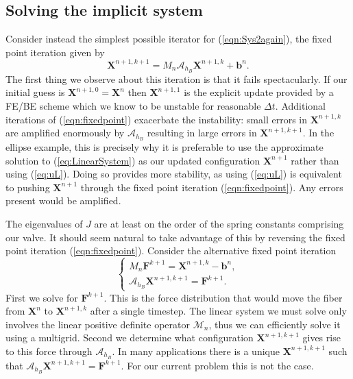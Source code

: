 \documentclass[preprint,12pt]{elsarticle}
\begin{document}
\subsection{Solving the implicit system}
Consider instead the simplest possible iterator for (\ref{eqn:Sys2again}), the fixed point iteration given by
\begin{equation}
\mathbf{X}^{n+1,k+1} = \mathit{M}_n\mathcal{A}_{h_B} \mathbf{X}^{n+1,k} + \mathbf{b}^n.
\label{eqn:fixedpoint}
\end{equation}
The first thing we observe about this iteration is that it fails spectacularly. If our initial guess is $\mathbf{X}^{n+1,0}=\mathbf{X}^n$ then $\mathbf{X}^{n+1,1}$ is the explicit update provided by a FE/BE scheme which we know to be unstable for reasonable $\Delta t$. Additional iterations of (\ref{eqn:fixedpoint}) exacerbate the instability: small errors in $\mathbf{X}^{n+1,k}$ are amplified enormously by $\mathcal{A}_{h_B}$ resulting in large errors in $\mathbf{X}^{n+1,k+1}$. In the ellipse example, this is precisely why it is preferable to use the approximate solution to (\ref{eq:LinearSystem}) as our updated configuration $\mathbf{X}^{n+1}$ rather than using (\ref{eq:uL}). Doing so provides more stability, as using (\ref{eq:uL}) is equivalent to pushing $\mathbf{X}^{n+1}$ through the fixed point iteration (\ref{eqn:fixedpoint}). Any errors present would be amplified.

The eigenvalues of $J$ are at least on the order of the spring constants comprising our valve. It should seem natural to take advantage of this by reversing the fixed point iteration (\ref{eqn:fixedpoint}). Consider the alternative fixed point iteration
\begin{equation}
\left\{
\begin{gathered}
\mathit{M}_n\mathbf{F}^{k+1} = \mathbf{X}^{n+1,k} - \mathbf{b}^n,\\
\mathcal{A}_{h_B}\mathbf{X}^{n+1,k+1} = \mathbf{F}^{k+1}.
\end{gathered}
\right.
\label{eqn:fixedpoint2}
\end{equation}
First we solve for $\mathbf{F}^{k+1}$. This is the force distribution that would move the fiber from $\mathbf{X}^n$ to $\mathbf{X}^{n+1,k}$ after a single timestep. The linear system we must solve only involves the linear positive definite operator $\mathcal{M}_n$, thus we can efficiently solve it using a multigrid. Second we determine what configuration $\mathbf{X}^{n+1,k+1}$ gives rise to this force through $\mathcal{A}_{h_B}$.
In many applications there is a unique $\mathbf{X}^{n+1,k+1}$ such that
$\mathcal{A}_{h_B}\mathbf{X}^{n+1,k+1} = \mathbf{F}^{k+1}$. For our current problem this is not the case.
\end{document}
